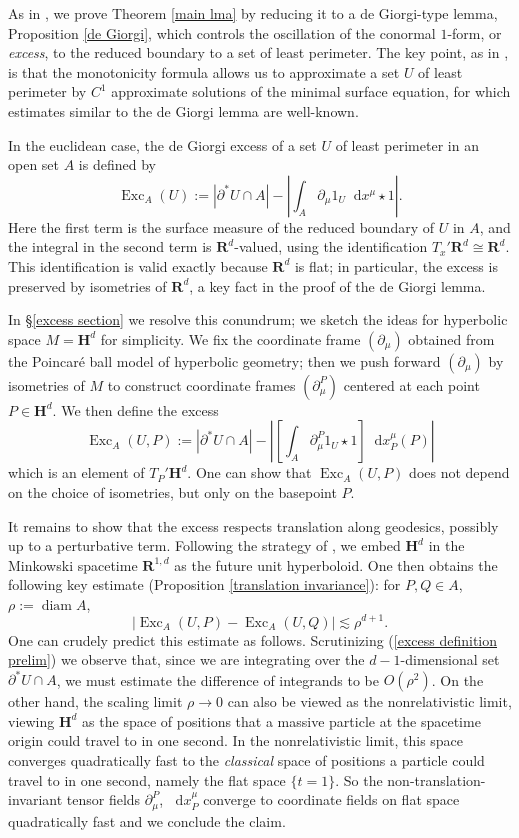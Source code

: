 \documentclass[reqno,10pt]{amsart}
\newcommand{\RR}{\mathbf{R}}
\newcommand{\Hyp}{\mathbf H}
\DeclareMathOperator{\diam}{diam}
\DeclareMathOperator{\Exc}{Exc}
\newcommand*\dif{\mathop{}\!\mathrm{d}}
\newcommand{\dfn}[1]{\emph{#1}\index{#1}}
\theoremstyle{definition}
\numberwithin{equation}{section}
\begin{document}
As in \cite{Miranda66, Giusti77}, we prove Theorem \ref{main lma} by reducing it to a de Giorgi-type lemma, Proposition \ref{de Giorgi}, which controls the oscillation of the conormal $1$-form, or \dfn{excess}, to the reduced boundary to a set of least perimeter.
The key point, as in \cite{Miranda66, Giusti77}, is that the monotonicity formula allows us to approximate a set $U$ of least perimeter by $C^1$ approximate solutions of the minimal surface equation, for which estimates similar to the de Giorgi lemma are well-known.

In the euclidean case, the de Giorgi excess of a set $U$ of least perimeter in an open set $A$ is defined by
$$\Exc_A(U) := |\partial^* U \cap A| - \left|\int_A \partial_\mu 1_U \dif x^\mu \star 1\right|.$$
Here the first term is the surface measure of the reduced boundary of $U$ in $A$, and the integral in the second term is $\RR^d$-valued, using the identification $T_x'\RR^d \cong \RR^d$.
This identification is valid exactly because $\RR^d$ is flat; in particular, the excess is preserved by isometries of $\RR^d$, a key fact in the proof of the de Giorgi lemma.

In \S\ref{excess section} we resolve this conundrum; we sketch the ideas for hyperbolic space $M = \Hyp^d$ for simplicity.
We fix the coordinate frame $(\partial_\mu)$ obtained from the Poincar\'e ball model of hyperbolic geometry; then we push forward $(\partial_\mu)$ by isometries of $M$ to construct coordinate frames $(\partial_\mu^P)$ centered at each point $P \in \Hyp^d$.
We then define the excess
\begin{equation}\label{excess definition prelim}
\Exc_A(U, P) := |\partial^* U \cap A| - \left|\left[\int_A \partial_\mu^P 1_U \star 1\right] \dif x^\mu_P(P)\right|
\end{equation}
which is an element of $T_P' \Hyp^d$.
One can show that $\Exc_A(U, P)$ does not depend on the choice of isometries, but only on the basepoint $P$.

It remains to show that the excess respects translation along geodesics, possibly up to a perturbative term.
Following the strategy of \cite{daskalopoulosPrep1}, we embed $\Hyp^d$ in the Minkowski spacetime $\RR^{1, d}$ as the future unit hyperboloid.
One then obtains the following key estimate (Proposition \ref{translation invariance}): for $P, Q \in A$, $\rho := \diam A$,
$$|\Exc_A(U, P) - \Exc_A(U, Q)| \lesssim \rho^{d + 1}.$$
One can crudely predict this estimate as follows.
Scrutinizing (\ref{excess definition prelim}) we observe that, since we are integrating over the $d-1$-dimensional set $\partial^* U \cap A$, we must estimate the difference of integrands to be $O(\rho^2)$.
On the other hand, the scaling limit $\rho \to 0$ can also be viewed as the nonrelativistic limit, viewing $\Hyp^d$ as the space of positions that a massive particle at the spacetime origin could travel to in one second.
In the nonrelativistic limit, this space converges quadratically fast to the \emph{classical} space of positions a particle could travel to in one second, namely the flat space $\{t = 1\}$.
So the non-translation-invariant tensor fields $\partial_\mu^P$, $\dif x^\mu_P$ converge to coordinate fields on flat space quadratically fast and we conclude the claim.
\end{document}
